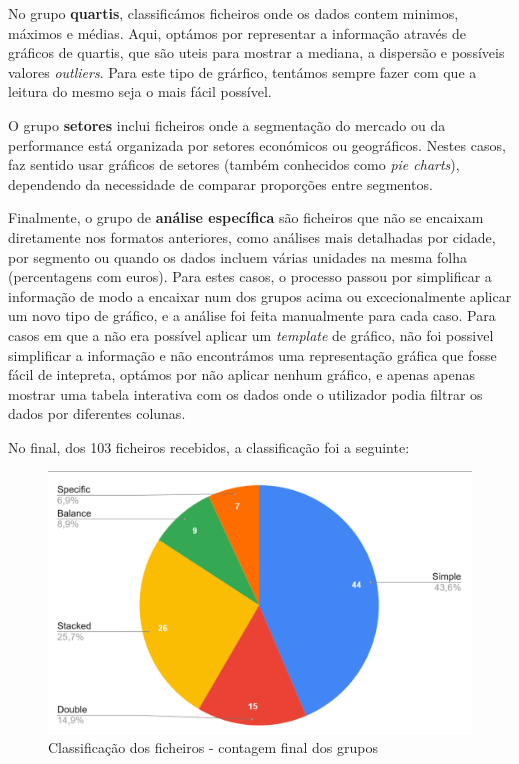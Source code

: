 No grupo \textbf{quartis}, classificámos ficheiros onde os dados contem minimos, máximos e médias. Aqui, optámos por representar a informação através de gráficos de quartis, que são uteis para mostrar a mediana, a dispersão e possíveis valores \textit{outliers}. Para este tipo de grárfico, tentámos sempre fazer com que a leitura do mesmo seja o mais fácil possível.

O grupo \textbf{setores} inclui ficheiros onde a segmentação do mercado ou da performance está organizada por setores económicos ou geográficos. Nestes casos, faz sentido usar gráficos de setores (também conhecidos como \textit{pie charts}),  dependendo da necessidade de comparar proporções entre segmentos.

Finalmente, o grupo de \textbf{análise específica} são ficheiros que não se encaixam diretamente nos formatos anteriores, como análises mais detalhadas por cidade, por segmento ou quando os dados incluem várias unidades na mesma folha (percentagens com euros). Para estes casos, o processo passou por simplificar a informação de modo a encaixar num dos grupos acima ou excecionalmente aplicar um novo tipo de gráfico, e a análise foi feita manualmente para cada caso. Para casos em que a não era possível aplicar um \textit{template} de gráfico, não foi possivel simplificar a informação e não encontrámos uma representação gráfica que fosse fácil de intepreta, optámos por não aplicar nenhum gráfico, e apenas apenas mostrar uma tabela interativa com os dados onde o utilizador podia filtrar os dados por diferentes colunas.


No final, dos 103 ficheiros recebidos, a classificação foi a seguinte:
\begin{figure}[h]
    \centering
    \includegraphics[width=\textwidth]{./img/stats1}
 \caption{Classificação dos ficheiros - contagem final dos grupos}
 \end{figure}

